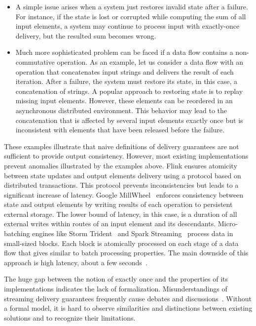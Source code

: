 \begin{itemize}
    \item A simple issue arises when a system just restores invalid state after a failure. For instance, if the state is lost or corrupted while computing the sum of all input elements, a system may continue to process input with exactly-once delivery, but the resulted sum becomes wrong. 
    \item Much more sophisticated problem can be faced if a data flow contains a non-commutative operation. As an example, let us consider a data flow with an operation that concatenates input strings and delivers the result of each iteration. After a failure, the system must restore its state, in this case, a concatenation of strings. A popular approach to restoring state is to replay missing input elements. However, these elements can be reordered in an asynchronous distributed environment. This behavior may lead to the concatenation that is affected by several input elements exactly once but is inconsistent with elements that have been released before the failure.    
\end{itemize}

These examples illustrate that naive definitions of delivery guarantees are not sufficient to provide output consistency. However, most existing implementations prevent anomalies illustrated by the examples above. Flink ensures atomicity between state updates and output elements delivery using a protocol based on distributed transactions. This protocol prevents inconsistencies but leads to a significant increase of latency. Google MillWheel~\cite{Akidau:2013:MFS:2536222.2536229} enforces consistency between state and output elements by writing results of each operation to persistent external storage. The lower bound of latency, in this case, is a duration of all external writes within routes of an input element and its descendants. Micro-batching engines like Storm Trident~\cite{apache:storm:trident} and Spark Streaming~\cite{Zaharia:2012:DSE:2342763.2342773} process data in small-sized blocks. Each block is atomically processed on each stage of a data flow that gives similar to batch processing properties. The main downside of this approach is high latency, about a few seconds~\cite{7530084, 7474816}.

The huge gap between the notion of exactly once and the properties of its implementations indicates the lack of formalization. Misunderstandings of streaming delivery guarantees frequently cause debates and discussions~\cite{JerryPengStreamIO, PaperTrail}. Without a formal model, it is hard to observe similarities and distinctions between existing solutions and to recognize their limitations.

